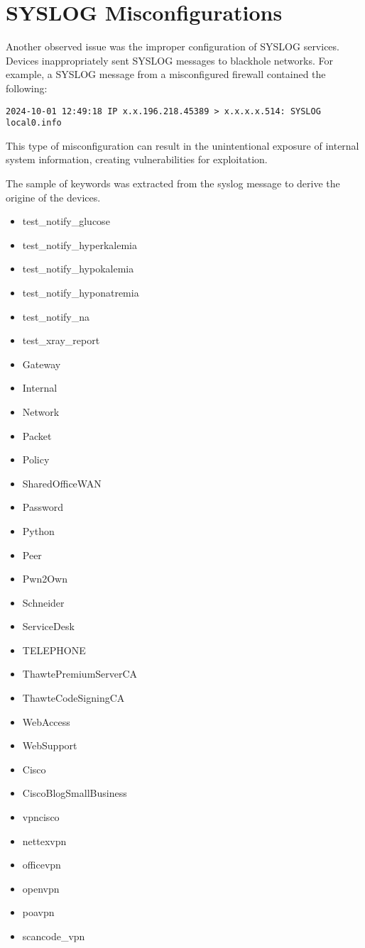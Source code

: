 \section{SYSLOG Misconfigurations}
Another observed issue was the improper configuration of SYSLOG services. Devices inappropriately sent SYSLOG messages to blackhole networks. For example, a SYSLOG message from a misconfigured firewall contained the following:
\begin{verbatim}
2024-10-01 12:49:18 IP x.x.196.218.45389 > x.x.x.x.514: SYSLOG local0.info
\end{verbatim}
This type of misconfiguration can result in the unintentional exposure of internal system information, creating vulnerabilities for exploitation.

The sample of keywords was extracted from the syslog message to derive the origine of the devices.

        \begin{itemize}
            \item test\_notify\_glucose
            \item test\_notify\_hyperkalemia
            \item test\_notify\_hypokalemia
            \item test\_notify\_hyponatremia
            \item test\_notify\_na
            \item test\_xray\_report
            \item Gateway
            \item Internal
            \item Network
            \item Packet
            \item Policy
            \item SharedOfficeWAN
            \item Password
            \item Python
            \item Peer
            \item Pwn2Own
            \item Schneider
            \item ServiceDesk
            \item TELEPHONE
            \item ThawtePremiumServerCA
            \item ThawteCodeSigningCA
            \item WebAccess
            \item WebSupport
            \item Cisco
            \item CiscoBlogSmallBusiness
            \item vpncisco
            \item nettexvpn
            \item officevpn
            \item openvpn
            \item poavpn
            \item scancode\_vpn
        \end{itemize}

